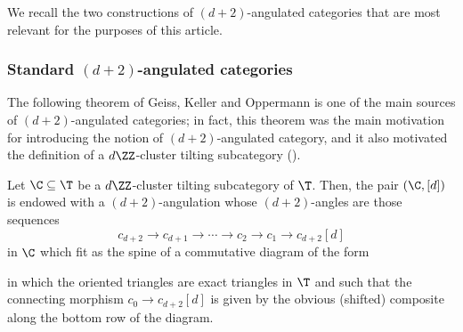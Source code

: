 \documentclass[a4paper]{amsart}
\begin{document}
We recall the two constructions of $(d+2)$-angulated categories that are most
relevant for the purposes of this article.

\subsubsection{Standard $(d+2)$-angulated categories}

The following theorem of Geiss, Keller and Oppermann is one of the main sources
of $(d+2)$-angulated categories; in fact, this theorem was the main motivation
for introducing the notion of $(d+2)$-angulated category, and it also motivated
the definition of a $d\ZZ$-cluster tilting subcategory ().

\begin{theorem}
  \label{thm:GKO-standard}
  Let $\C\subseteq\T$ be a $d\ZZ$-cluster tilting subcategory of $\T$. Then, the
  pair $(\C,[d])$ is endowed with a $(d+2)$-angulation whose $(d+2)$-angles are
  those sequences
  \[
    c_{d+2}\to c_{d+1}\to\cdots\to c_2\to c_1\to c_{d+2}[d]
  \]
  in $\C$ which fit as the spine of a commutative diagram of the form
  \begin{center}
  \end{center}
  in which the oriented triangles are exact triangles in $\T$ and such that the
  connecting morphism $c_0\to c_{d+2}[d]$ is given by the obvious (shifted)
  composite along the bottom row of the diagram.
\end{theorem}
\end{document}
